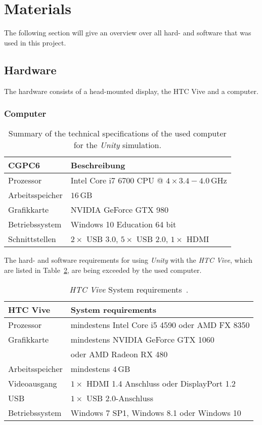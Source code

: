 \section{Materials}\label{sec:Materials}
The following section will give an overview over all hard- and software that was used in this project. 

\subsection{Hardware}\label{sec:Hardware}
The hardware consists of a head-mounted display, the HTC Vive and a computer. 

\subsubsection{Computer}\label{sec:Computer}

\begin{table}[H]
	\centering
	\begin{tabular}{|l|l|}
		\hline
		\Absatzbox{}
		\textbf{CGPC6}& \textbf{Beschreibung} \\
		\hline
		Prozessor & Intel Core i7 6700 CPU @ $4\times3.4-4.0\,$GHz \\
		\hline
		Arbeitsspeicher & $16\,$GB \\
		\hline 
		Grafikkarte & NVIDIA GeForce GTX 980\\
		\hline
		Betriebssystem & Windows 10 Education 64 bit \\
		\hline
		Schnittstellen & $2\times$ USB 3.0, $5\times$ USB 2.0, $1\times $ HDMI\\
		\hline
	\end{tabular}
	\caption{Summary of the technical specifications of the used computer for the \textit{Unity} simulation.}
	\label{tab:Computer}
\end{table}

The hard- and software requirements for using \textit{Unity} with the \textit{HTC Vive}, which are listed in Table~\ref{tab:viveReq}, are being exceeded by the used computer.   

\begin{table}[H]
	\centering
	\begin{tabular}{|l|l|}
		\hline
		\Absatzbox{}
		\textbf{HTC Vive}& \textbf{System requirements} \\
		\hline
		Prozessor & mindestens Intel Core i5 4590 oder AMD FX 8350\\
		\hline
		Grafikkarte & mindestens NVIDIA GeForce GTX 1060\\
		&oder AMD Radeon RX 480\\
		\hline
		Arbeitsspeicher & mindestens $4\,$GB\\		
		\hline
		Videoausgang & $1\times$ HDMI 1.4 Anschluss oder DisplayPort 1.2\\
		\hline
		USB & $1\times$ USB 2.0-Anschluss\\
		\hline
		Betriebssystem & Windows 7 SP1, Windows 8.1 oder Windows 10\\
		\hline
	\end{tabular}
	\caption{\textit{HTC Vive} System requirements~\cite{website:HTC_Vive_Ready}.}
	\label{tab:viveReq}
\end{table}

